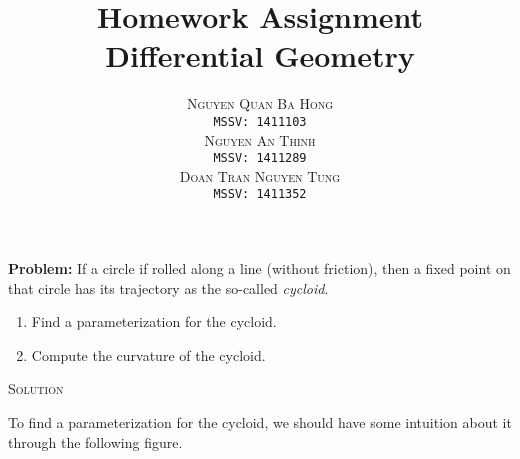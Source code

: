 \documentclass[a4paper]{report}
\title{\Huge Homework Assignment\\Differential Geometry}
\author{\textsc{Nguyen Quan Ba Hong}\\
	{\small \texttt{MSSV: 1411103}}\\
	\textsc{Nguyen An Thinh}\\
	{\small \texttt{MSSV: 1411289}}\\
	\textsc{Doan Tran Nguyen Tung}\\
{\small \texttt{MSSV: 1411352}}}
\begin{document}
\maketitle
\textbf{Problem:} If a circle if rolled along a line (without friction), then a fixed point on that circle has its trajectory as the so-called \textit{cycloid}.
\begin{enumerate}[label=(\alph*), leftmargin=*]
	\item\label{a} Find a parameterization for the cycloid.
	\item\label{b} Compute the curvature of the cycloid.
\end{enumerate}

\textsc{Solution}

To find a parameterization for the cycloid, we should have some intuition about it through the following figure.
\end{document}
